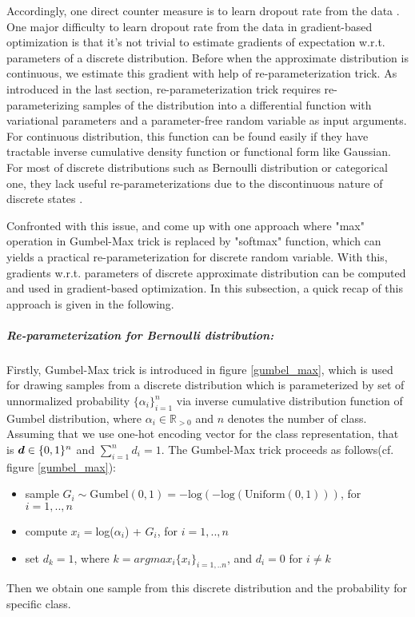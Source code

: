 Accordingly, one direct counter measure is to learn dropout rate from the data \cite{gal2017concrete}. One major difficulty to learn dropout rate from the data in gradient-based optimization is that it's not trivial to estimate gradients of expectation w.r.t. parameters of a discrete distribution. Before when the approximate distribution is continuous, we estimate this gradient with help of re-parameterization trick. As introduced in the last section, re-parameterization trick requires re-parameterizing samples of the distribution into a differential function with variational parameters and a parameter-free random variable as input arguments. For continuous distribution, this function can be found easily if they have tractable inverse cumulative density function or functional form like Gaussian\cite{kingma2013auto}. For most of discrete distributions such as Bernoulli distribution or categorical one, they lack useful re-parameterizations
due to the discontinuous nature of discrete states \cite{maddison2016concrete}. 

Confronted with this issue, \cite{jang2016categorical} and \cite{maddison2016concrete} come up with one approach where "max" operation in Gumbel-Max trick is replaced by "softmax" function, which can yields a practical re-parameterization for discrete random variable. With this, gradients w.r.t. parameters of discrete approximate distribution can be computed and used in gradient-based optimization. In this subsection, a quick recap of this approach is given in the following.

\subparagraph{Re-parameterization for Bernoulli distribution:}
Firstly, Gumbel-Max trick\cite{maddison2014sampling} is introduced in figure \ref{gumbel_max}, which is used for drawing samples from a discrete distribution which is parameterized by set of unnormalized probability $\{\alpha_i\}_{i=1}^{n}$ via inverse cumulative distribution function of Gumbel distribution, where $\alpha_i \in \mathbb R_{>0}$ and $n$ denotes the number of class. Assuming that we use one-hot encoding vector for the class representation, that is $\boldsymbol d \in \{0,1\}^n $ and $\sum_{i=1}^{n}d_i = 1$. The Gumbel-Max trick proceeds as follows(cf. figure \ref{gumbel_max}):
\begin{itemize}
	\item sample $G_i \sim \text{Gumbel}(0,1) = -\text{log}(-\text{log}(\text{Uniform}(0,1)))$, for $i=1,..,n$
	\item compute $x_i = $log($\alpha_i$) + $G_i$, for $i=1,..,n$
	\item set $d_k = 1$, where $k=argmax_i\{x_i\}_{i=1,..n}$, and $d_i = 0$ for $i \neq k$
\end{itemize}
Then we obtain one sample from this discrete distribution and the probability for specific class.

